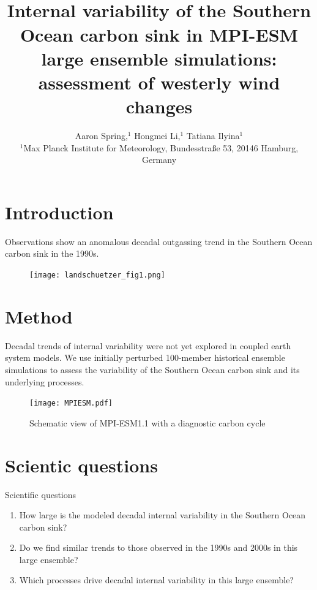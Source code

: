 \documentclass[aspectratio=169]{beamer}
\title{\vspace{5mm} \\ Internal variability of the Southern Ocean carbon sink in MPI-ESM large ensemble simulations: \\ assessment of westerly wind changes}
\subtitle{ \vspace{1cm} Aaron Spring,$^{1}$ Hongmei Li,$^{1}$ Tatiana Ilyina$^{1}$
\\ \normalsize{$^{1}$Max Planck Institute for Meteorology, Bundesstra{\ss}e 53, 20146 Hamburg, Germany}
}
\begin{document}
\begin{frame}[noframenumbering]
	\titlepage
\end{frame}

\section{Introduction}
\begin{frame}{Observations \citep{landschuetzer2015} show an anomalous decadal outgassing trend in the Southern Ocean carbon sink in the 1990s.}
	\begin{figure}[h]
	\centering
	\texttt{[image: landschuetzer\_fig1.png]} %
	\label{fig:SOCS_ensmean_ensstd}
	\end{figure}
	
\end{frame}
	
	
\section{Method}
\begin{frame}{Decadal trends of internal variability were not yet explored in coupled earth system models. We use initially perturbed 100-member historical ensemble simulations to assess the variability of the Southern Ocean carbon sink and its underlying processes.}

	\begin{figure}
		\centering
		\texttt{[image: MPIESM.pdf]}
		\caption{Schematic view of MPI-ESM1.1 with a diagnostic carbon cycle}
	\end{figure}
\end{frame}

\section{Scientic questions}
\begin{frame}{Scientific questions}
\Large
	\begin{enumerate}
	\item How large is the modeled decadal internal variability in the Southern Ocean carbon sink?
	\item Do we find similar trends to those observed in the 1990s and 2000s in this large ensemble?
	\item Which processes drive decadal internal variability in this large ensemble?
	\end{enumerate}
\end{frame}
\end{document}
